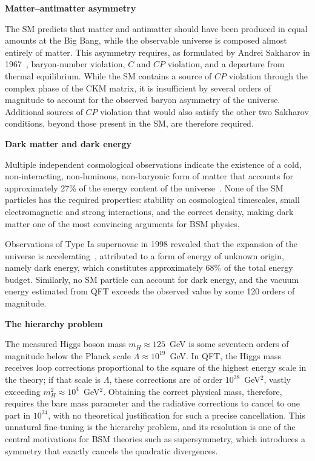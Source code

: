 \vspace{0.5 cm}
\noindent\textbf{Matter--antimatter asymmetry}
\vspace{0.5 cm}

The SM predicts that matter and antimatter should have been produced in equal amounts at the Big Bang, while the observable universe is composed almost entirely of matter. This asymmetry requires, as formulated by Andrei Sakharov in 1967~\cite{Sakharov:1967dj}, baryon-number violation, $C$ and $CP$ violation, and a departure from thermal equilibrium. While the SM contains a source of $CP$ violation through the complex phase of the CKM matrix, it is insufficient by several orders of magnitude to account for the observed baryon asymmetry of the universe. Additional sources of $CP$ violation that would also satisfy the other two Sakharov conditions, beyond those present in the SM, are therefore required.

\vspace{0.5 cm}
\noindent\textbf{Dark matter and dark energy}
\vspace{0.5 cm}

Multiple independent cosmological observations indicate the existence of a cold, non-interacting, non-luminous, non-baryonic form of matter that accounts for approximately 27\% of the energy content of the universe~\cite{Planck2020, Clowe_2006}. None of the SM particles has the required properties: stability on cosmological timescales, small electromagnetic and strong interactions, and the correct density, making dark matter one of the most convincing arguments for BSM physics.

Observations of Type Ia supernovae in 1998 revealed that the expansion of the universe is accelerating~\cite{Riess1998, Perlmutter1999}, attributed to a form of energy of unknown origin, namely dark energy, which constitutes approximately 68\% of the total energy budget. Similarly, no SM particle can account for dark energy, and the vacuum energy estimated from QFT exceeds the observed value by some 120 orders of magnitude.

\newpage

\vspace{0.5 cm}
\noindent\textbf{The hierarchy problem}
\vspace{0.5 cm}

The measured Higgs boson mass $m_H \approx 125$~GeV is some seventeen orders of magnitude below the Planck scale $\Lambda \approx 10^{19}$~GeV. In QFT, the Higgs mass receives loop corrections proportional to the square of the highest energy scale in the theory; if that scale is $\Lambda$, these corrections are of order $10^{38}$~GeV$^2$, vastly exceeding $m_H^2 \approx 10^4$~GeV$^2$. Obtaining the correct physical mass, therefore, requires the bare mass parameter and the radiative corrections to cancel to one part in $10^{34}$, with no theoretical justification for such a precise cancellation. This unnatural fine-tuning is the hierarchy problem, and its resolution is one of the central motivations for BSM theories such as supersymmetry, which introduces a symmetry that exactly cancels the quadratic divergences.

